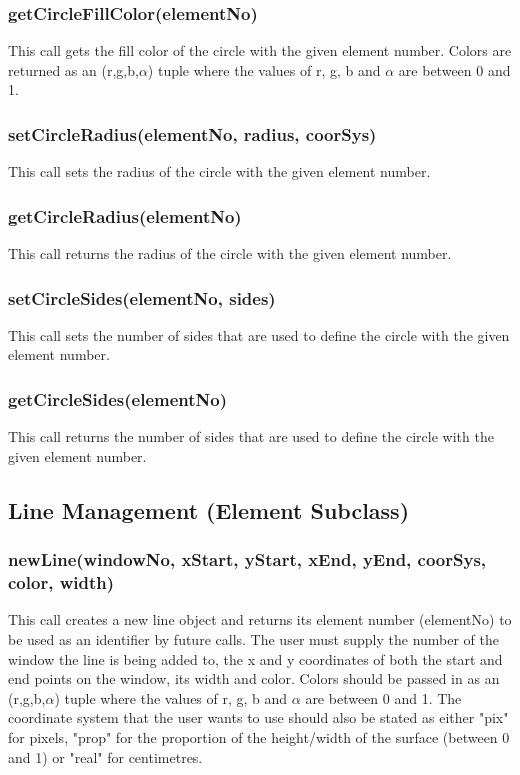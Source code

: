 \documentclass{acm_proc_article-sp}
\begin{document}
\subsubsection{getCircleFillColor(elementNo)}
This call gets the fill color of the circle with the given element number. Colors are returned as an (r,g,b,$\alpha$) tuple where the values of r, g, b and $\alpha$ are between 0 and 1.
\subsubsection{setCircleRadius(elementNo, radius, coorSys)}
This call sets the radius of the circle with the given element number.
\subsubsection{getCircleRadius(elementNo)}
This call returns the radius of the circle with the given element number.
\subsubsection{setCircleSides(elementNo, sides)}
This call sets the number of sides that are used to define the circle with the given element number.
\subsubsection{getCircleSides(elementNo)}
This call returns the number of sides that are used to define the circle with the given element number.
\subsection{Line Management (Element Subclass)}
\subsubsection{newLine(windowNo, xStart, yStart, xEnd, yEnd, coorSys, color, width)}
This call creates a new line object and returns its element number (elementNo) to be used as an identifier by future calls. The user must supply the number of the window the line is being added to, the x and y coordinates of both the start and end points on the window, its width and color. Colors should be passed in as an (r,g,b,$\alpha$) tuple where the values of r, g, b and $\alpha$ are between 0 and 1. The coordinate system that the user wants to use should also be stated as either "pix" for pixels, "prop" for the proportion of the height/width of the surface (between 0 and 1) or "real" for centimetres.
\end{document}
